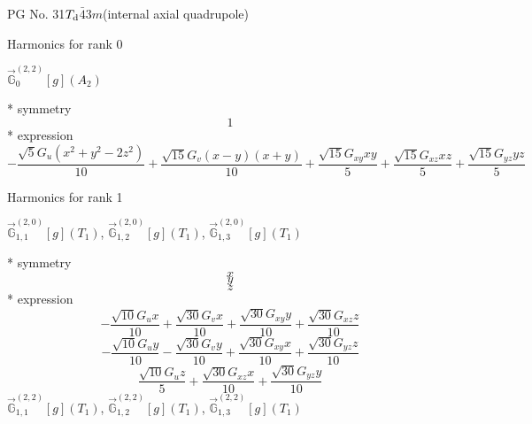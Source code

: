 \documentclass[fleqn,8pt]{jsarticle}
\begin{document}
\setcounter{MaxMatrixCols}{32}

\renewcommand{\tablename}{Table~}
\renewcommand{\figurename}{Figure~}
\begin{center}
\LARGE
PG No. 31\quad$T_{\rm d}$\quad$\bar{4}3m$\quad[ cubic ] (internal axial quadrupole)
\end{center}

\noindent * Harmonics for rank 0

\noindent\quad $\vec{\mathbb{G}}_{0}^{(2,2)}[g](A_{2})$

\noindent\quad ** symmetry
\begin{dmath*}
1
\end{dmath*}
\noindent\quad ** expression
\begin{dmath*}
- \frac{\sqrt{5} G_{u} \left(x^{2} + y^{2} - 2 z^{2}\right)}{10} + \frac{\sqrt{15} G_{v} \left(x - y\right) \left(x + y\right)}{10} + \frac{\sqrt{15} G_{xy} x y}{5} + \frac{\sqrt{15} G_{xz} x z}{5} + \frac{\sqrt{15} G_{yz} y z}{5}
\end{dmath*}

\noindent * Harmonics for rank 1

\noindent\quad $\vec{\mathbb{G}}_{1,1}^{(2,0)}[g](T_{1})$, $\vec{\mathbb{G}}_{1,2}^{(2,0)}[g](T_{1})$, $\vec{\mathbb{G}}_{1,3}^{(2,0)}[g](T_{1})$

\noindent\quad ** symmetry
\begin{dmath*}
x
\end{dmath*}
\begin{dmath*}
y
\end{dmath*}
\begin{dmath*}
z
\end{dmath*}
\noindent\quad ** expression
\begin{dmath*}
- \frac{\sqrt{10} G_{u} x}{10} + \frac{\sqrt{30} G_{v} x}{10} + \frac{\sqrt{30} G_{xy} y}{10} + \frac{\sqrt{30} G_{xz} z}{10}
\end{dmath*}
\begin{dmath*}
- \frac{\sqrt{10} G_{u} y}{10} - \frac{\sqrt{30} G_{v} y}{10} + \frac{\sqrt{30} G_{xy} x}{10} + \frac{\sqrt{30} G_{yz} z}{10}
\end{dmath*}
\begin{dmath*}
\frac{\sqrt{10} G_{u} z}{5} + \frac{\sqrt{30} G_{xz} x}{10} + \frac{\sqrt{30} G_{yz} y}{10}
\end{dmath*}
\noindent\quad $\vec{\mathbb{G}}_{1,1}^{(2,2)}[g](T_{1})$, $\vec{\mathbb{G}}_{1,2}^{(2,2)}[g](T_{1})$, $\vec{\mathbb{G}}_{1,3}^{(2,2)}[g](T_{1})$
\end{document}
